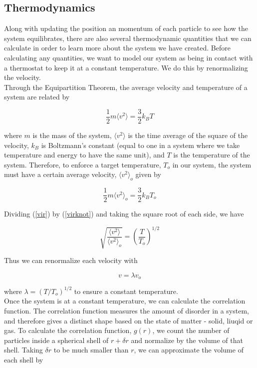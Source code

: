 \documentclass{article}
\begin{document}
\begin{multicols}{2}
\subsection{Thermodynamics}
\label{thermo}

Along with updating the position an momentum of each particle to see how the system equilibrates, there are also several thermodynamic quantities that we can calculate in order to learn more about the system we have created.  Before calculating any quantities, we want to model our system as being in contact with a thermostat to keep it at a constant temperature.  We do this by renormalizing the velocity.  \\

Through the Equipartition Theorem, the average velocity and temperature of a system are related by

\begin{equation}
\label{vir}
\frac{1}{2}m \langle v^2 \rangle = \frac{3}{2} k_B T
\end{equation}

\noindent where $m$ is the mass of the system, $\langle v^2 \rangle$ is the time average of the square of the velocity, $k_B$ is Boltzmann's constant (equal to one in a system where we take temperature and energy to have the same unit), and $T$ is the temperature of the system.  Therefore, to enforce a target temperature, $T_o$ in our system, the system must have a certain average velocity, $\langle v^2 \rangle _o$ given by

\begin{equation}
\label{virknot}
\frac{1}{2}m \langle v^2 \rangle _o = \frac{3}{2} k_B T_o
\end{equation}

Dividing (\ref{vir}) by (\ref{virknot}) and taking the square root of each side, we have

\begin{equation}
\sqrt{\frac{\langle v^2 \rangle}{\langle v^2 \rangle _o}} = \left ( \frac{T}{T_o} \right ) ^{1/2}
\end{equation}

\noindent Thus we can renormalize each velocity with 

\begin{equation}
v = \lambda v_o
\end{equation}

\noindent where $\lambda = (T/T_o)^{1/2}$ to ensure a constant temperature.  \\

Once the system is at a constant temperature, we can calculate the correlation function.  The correlation function measures the amount of disorder in a system, and therefore gives a distinct shape based on the state of matter - solid, liuqid or gas.  To calculate the correlation function, $g(r)$, we count the number of particles inside a spherical shell of $r + \delta r$ and normalize by the volume of that shell.  Taking $\delta r$ to be much smaller than $r$, we can approximate the volume of each shell by


\end{multicols}
\end{document}
